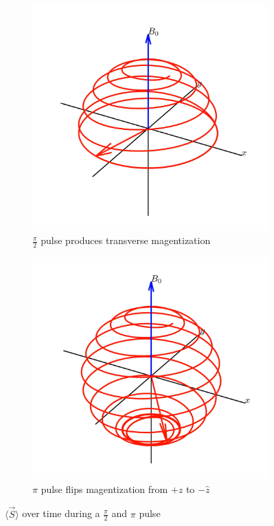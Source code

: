 \documentclass[
    floatfix,  %
    reprint,
    amsmath,
    amssymb,
    aps,
]{revtex4-2}
\newcommand{\halfpi}{\frac{\pi}{2}}
\begin{document}
\begin{figure}[htbp]
    \centering
    \begin{subfigure}{0.3\linewidth}
        \includegraphics[width = \linewidth]{figs/pi-2-pulse.png}
        \caption{$\halfpi$ pulse produces transverse magentization}
    \end{subfigure}
    \begin{subfigure}{0.3\linewidth}
        \includegraphics[width = \linewidth]{figs/pi-pulse.png}
        \caption{$\pi$ pulse flips magentization from $+\hat{z}$ to $-\hat{z}$}
    \end{subfigure}
    \caption{$\langle \vec{S} \rangle$ over time during a $\halfpi$ and $\pi$ pulse}\label{fig:pulse-spirals}
\end{figure}
\end{document}

